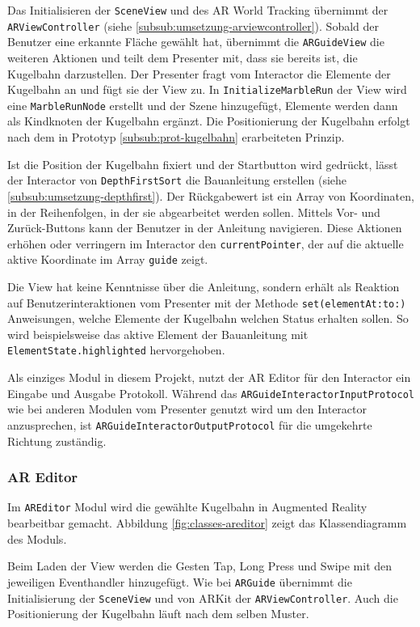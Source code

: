 Das Initialisieren der \texttt{SceneView} und des AR World Tracking übernimmt der \texttt{ARViewController} (siehe \ref{subsub:umsetzung-arviewcontroller}).
Sobald der Benutzer eine erkannte Fläche gewählt hat, übernimmt die \texttt{ARGuideView} die weiteren Aktionen und teilt dem Presenter mit, dass sie bereits ist, die Kugelbahn darzustellen.
Der Presenter fragt vom Interactor die Elemente der Kugelbahn an und fügt sie der View zu.
In \texttt{InitializeMarbleRun} der View wird eine \texttt{MarbleRunNode} erstellt und der Szene hinzugefügt, Elemente werden dann als Kindknoten der Kugelbahn ergänzt.
Die Positionierung der Kugelbahn erfolgt nach dem in Prototyp \ref{subsub:prot-kugelbahn} erarbeiteten Prinzip.

Ist die Position der Kugelbahn fixiert und der Startbutton wird gedrückt, lässt der Interactor von \texttt{DepthFirstSort} die Bauanleitung erstellen (siehe \ref{subsub:umsetzung-depthfirst}).
Der Rückgabewert ist ein Array von Koordinaten, in der Reihenfolgen, in der sie abgearbeitet werden sollen.
Mittels Vor- und Zurück-Buttons kann der Benutzer in der Anleitung navigieren.
Diese Aktionen erhöhen oder verringern im Interactor den \texttt{currentPointer}, der auf die aktuelle aktive Koordinate im Array \texttt{guide} zeigt.

Die View hat keine Kenntnisse über die Anleitung, sondern erhält als Reaktion auf Benutzerinteraktionen vom Presenter mit der Methode \texttt{set(elementAt:to:)} Anweisungen, welche Elemente der Kugelbahn welchen Status erhalten sollen.
So wird beispielsweise das aktive Element der Bauanleitung mit \texttt{ElementState.highlighted} hervorgehoben.

Als einziges Modul in diesem Projekt, nutzt der AR Editor für den Interactor ein Eingabe und Ausgabe Protokoll.
Während das \texttt{ARGuideInteractorInputProtocol} wie bei anderen Modulen vom Presenter genutzt wird um den Interactor anzusprechen, ist \texttt{ARGuideInteractorOutputProtocol} für die umgekehrte Richtung zuständig.


\subsubsection{AR Editor}

Im \texttt{AREditor} Modul wird die gewählte Kugelbahn in Augmented Reality bearbeitbar gemacht.
Abbildung \ref{fig:classes-areditor} zeigt das Klassendiagramm des Moduls.

Beim Laden der View werden die Gesten Tap, Long Press und Swipe mit den jeweiligen Eventhandler hinzugefügt.
Wie bei \texttt{ARGuide} übernimmt die Initialisierung der \texttt{SceneView} und von ARKit der \texttt{ARViewController}.
Auch die Positionierung der Kugelbahn läuft nach dem selben Muster.


